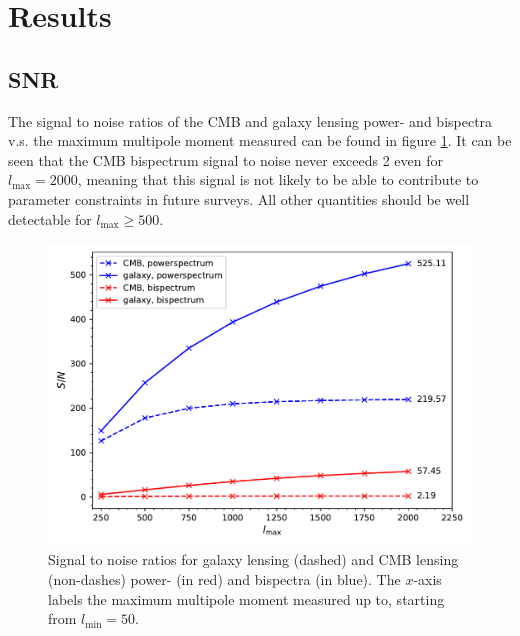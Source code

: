 \documentclass[11pt]{article} %
\begin{document}
\section{Results}\label{sec:results}
\subsection{SNR} 
The signal to noise ratios of the CMB and galaxy lensing power- and bispectra v.s. the maximum multipole moment measured can be found in figure \ref{fig:snrplots}. It can be seen that the CMB bispectrum signal to noise never exceeds 2 even for $l_{\max} = 2000$, meaning that this signal is not likely to be able to contribute to parameter constraints in future surveys. All other quantities should be well detectable for $l_{\max}\geq 500$.
\begin{figure}
    \includegraphics[width=\textwidth]{figures/snrplots.pdf}
    \caption{Signal to noise ratios for galaxy lensing (dashed) and CMB lensing (non-dashes) power- (in red) and bispectra (in blue). The $x$-axis labels the maximum multipole moment measured up to, starting from $l_{\min}=50$.}
    \label{fig:snrplots}
\end{figure}
\end{document}
